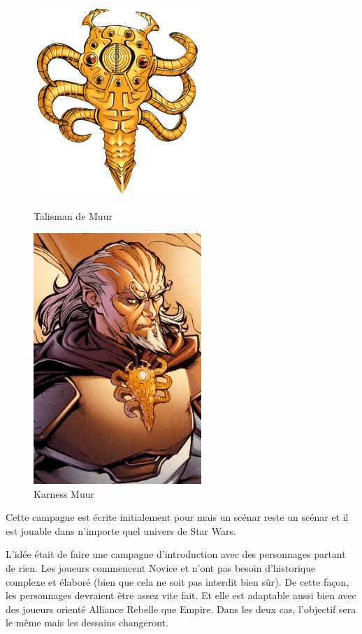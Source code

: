 \documentclass{jdrp}
\begin{document}
	\begin{figure}
		\centering
		\includegraphics[width=180pt]{_img/talisman.png}
		\caption{\label{fig:talisman-de-muur}Talisman de Muur}
		\vspace{1\baselineskip}
		\includegraphics[width=180pt]{_img/pnjs/karness-muur.jpg}
		\caption{\label{fig:karness-muur}Karness Muur}
	\end{figure}
	
	Cette campagne est écrite initialement pour  mais un scénar reste un scénar et il est jouable dans n’importe quel univers de Star Wars.

	L’idée était de faire une campagne d’introduction avec des personnages partant de rien. Les joueurs commencent Novice et n’ont pas besoin d’historique complexe et élaboré (bien que cela ne soit pas interdit bien sûr). De cette façon, les personnages devraient être assez vite fait. Et elle est adaptable aussi bien avec des joueurs orienté Alliance Rebelle que Empire. Dans les deux cas, l’objectif sera le même mais les dessains changeront.
\end{document}
